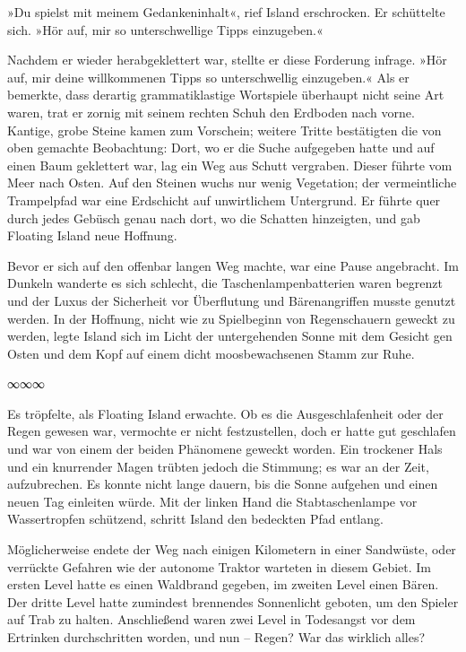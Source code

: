 »Du spielst mit meinem Gedankeninhalt«, rief Island erschrocken. Er schüttelte sich. »Hör auf, mir so unterschwellige Tipps einzugeben.«

Nachdem er wieder herabgeklettert war, stellte er diese Forderung infrage. »Hör auf, mir deine willkommenen Tipps so unterschwellig einzugeben.« Als er bemerkte, dass derartig grammatiklastige Wortspiele überhaupt nicht seine Art waren, trat er zornig mit seinem rechten Schuh den Erdboden nach vorne. Kantige, grobe Steine kamen zum Vorschein; weitere Tritte bestätigten die von oben gemachte Beobachtung: Dort, wo er die Suche aufgegeben hatte und auf einen Baum geklettert war, lag ein Weg aus Schutt vergraben. Dieser führte vom Meer nach Osten. Auf den Steinen wuchs nur wenig Vegetation; der vermeintliche Trampelpfad war eine Erdschicht auf unwirtlichem Untergrund. Er führte quer durch jedes Gebüsch genau nach dort, wo die Schatten hinzeigten, und gab Floating Island neue Hoffnung.

Bevor er sich auf den offenbar langen Weg machte, war eine Pause angebracht. Im Dunkeln wanderte es sich schlecht, die Taschenlampenbatterien waren begrenzt und der Luxus der Sicherheit vor Überflutung und Bärenangriffen musste genutzt werden. In der Hoffnung, nicht wie zu Spielbeginn von Regenschauern geweckt zu werden, legte Island sich im Licht der untergehenden Sonne mit dem Gesicht gen Osten und dem Kopf auf einem dicht moosbewachsenen Stamm zur Ruhe.

\begin{center}
∞∞∞
\end{center}

Es tröpfelte, als Floating Island erwachte. Ob es die Ausgeschlafenheit oder der Regen gewesen war, vermochte er nicht festzustellen, doch er hatte gut geschlafen und war von einem der beiden Phänomene geweckt worden. Ein trockener Hals und ein knurrender Magen trübten jedoch die Stimmung; es war an der Zeit, aufzubrechen. Es konnte nicht lange dauern, bis die Sonne aufgehen und einen neuen Tag einleiten würde. Mit der linken Hand die Stabtaschenlampe vor Wassertropfen schützend, schritt Island den bedeckten Pfad entlang.

Möglicherweise endete der Weg nach einigen Kilometern in einer Sandwüste, oder verrückte Gefahren wie der autonome Traktor warteten in diesem Gebiet. Im ersten Level hatte es einen Waldbrand gegeben, im zweiten Level einen Bären. Der dritte Level hatte zumindest brennendes Sonnenlicht geboten, um den Spieler auf Trab zu halten. Anschließend waren zwei Level in Todesangst vor dem Ertrinken durchschritten worden, und nun – Regen? War das wirklich alles?

